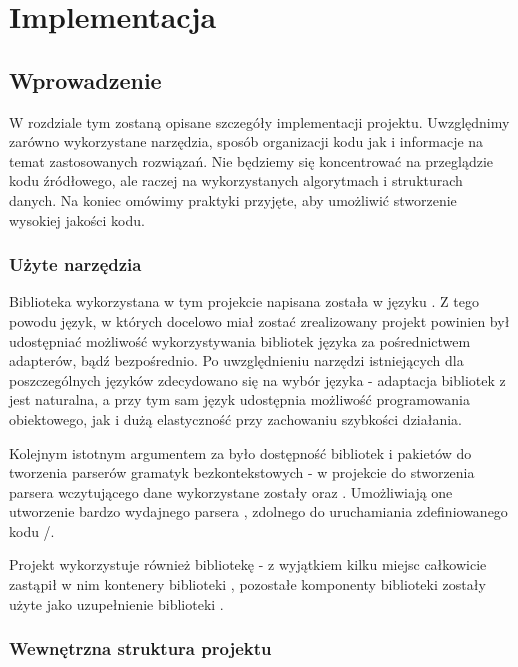 \documentclass[polish]{standalone}
\begin{document}
\pagestyle{headings}

\chapter{Implementacja}

\section{Wprowadzenie}

W rozdziale tym zostaną opisane szczegóły implementacji projektu. Uwzględnimy zarówno wykorzystane narzędzia, sposób
organizacji kodu jak i informacje na temat zastosowanych rozwiązań. Nie będziemy się koncentrować na przeglądzie kodu
źródłowego, ale raczej na wykorzystanych algorytmach i strukturach danych. Na koniec omówimy praktyki przyjęte, aby
umożliwić stworzenie wysokiej jakości kodu.

\subsection{Użyte narzędzia}

Biblioteka  wykorzystana w tym projekcie napisana została w języku . Z tego powodu język, w których
docelowo miał zostać zrealizowany projekt powinien był udostępniać możliwość wykorzystywania bibliotek języka 
za pośrednictwem adapterów, bądź bezpośrednio. Po uwzględnieniu narzędzi istniejących dla poszczególnych języków
zdecydowano się na wybór języka  - adaptacja bibliotek z  jest naturalna, a przy tym sam język
udostępnia możliwość programowania obiektowego, jak i dużą elastyczność przy zachowaniu szybkości działania.

Kolejnym istotnym argumentem za  było dostępność bibliotek i pakietów do tworzenia parserów gramatyk
bezkontekstowych - w projekcie do stworzenia parsera wczytującego dane wykorzystane zostały  oraz
. Umożliwiają one utworzenie bardzo wydajnego parsera , zdolnego do uruchamiania
zdefiniowanego kodu /.

Projekt wykorzystuje również bibliotekę  - z wyjątkiem kilku miejsc  całkowicie
zastąpił w nim kontenery biblioteki , pozostałe komponenty biblioteki  zostały użyte jako
uzupełnienie biblioteki .

\subsection{Wewnętrzna struktura projektu}
\end{document}
